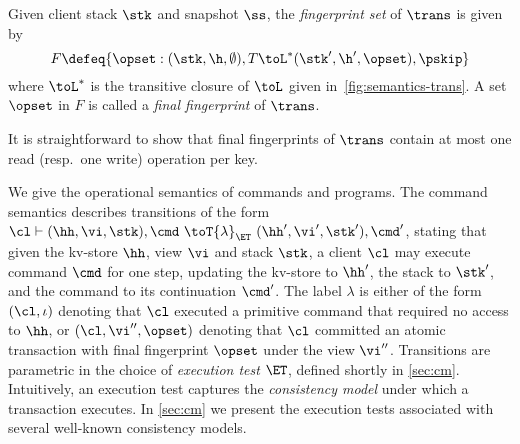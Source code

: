 \begin{definition}
Given client stack $\stk$ and snapshot $\ss$, the \emph{fingerprint set} of $\trans$ is given by 
\[F \defeq
\{\opset : (\stk, \h, \emptyset), T \toL^* (\stk', \h', \opset),
\pskip \}
\]
where $\toL^*$ is the transitive closure of $\toL$ given in~\cref{fig:semantics-trans}.  
A set $\opset$ in $F$ is called a \emph{final fingerprint} of $\trans$. 
\end{definition}
\noindent It is straightforward to show that final fingerprints of $\trans$ contain at most one read (resp.\ one write) operation per key. \\


 We give the operational
semantics of commands and programs. The command semantics describes
transitions of the form
$\cl \vdash (\hh, \vi, \stk), \cmd \ \toT{\lambda}_{\ET} \ (\hh', \vi', \stk') ,
\cmd'$, stating that given the kv-store $\hh$, view $\vi$ and stack $\stk$, 
a client $\cl$ may execute command $\cmd$ for one step, updating 
the kv-store to $\hh'$, the stack to $\stk'$, and the command to its continuation $\cmd'$.
The label $\lambda$ is either of the form $(\cl, \iota)$ denoting that $\cl$ executed a primitive command
that required no access to $\hh$, 
or $(\cl, \vi'', \opset)$ denoting that $\cl$ committed an atomic transaction with final fingerprint $\opset$ under the view $\vi''$.
Transitions are parametric in the choice of \emph{execution test} $\ET$, defined shortly in \cref{sec:cm}.
Intuitively, an execution test captures the \emph{consistency model} under which a transaction executes.
In \cref{sec:cm} we present the execution tests associated with several well-known consistency models.  %




